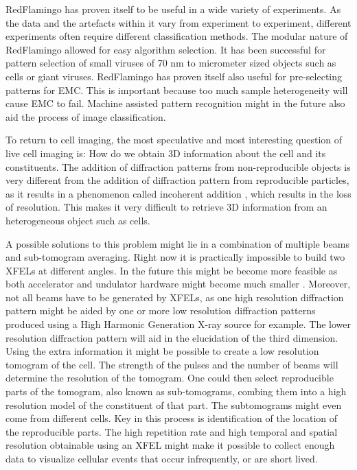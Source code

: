 RedFlamingo has proven itself to be useful in a wide variety of experiments. As the data and the artefacts within it vary from experiment to experiment, different experiments often require different classification methods. The modular nature of RedFlamingo allowed for easy algorithm selection. It has been successful for pattern selection of small viruses of 70 nm to micrometer sized objects such as cells or giant viruses. RedFlamingo has proven itself also useful for pre-selecting patterns for EMC. This is important because too much sample heterogeneity will cause EMC to fail. Machine assisted pattern recognition might in the future also aid the process of image classification. 

To return to cell imaging, the most speculative and most interesting question of live cell imaging is: How do we obtain 3D information about the cell and its constituents. The addition of diffraction patterns from non-reproducible objects is very different from the addition of diffraction pattern from reproducible particles, as it results in a phenomenon called incoherent addition \cite{Maia2009}, which results in the loss of resolution. This makes it very difficult to retrieve 3D information from an heterogeneous object such as cells. 

A possible solutions to this problem might lie in a combination of multiple beams and sub-tomogram averaging. Right now it is practically impossible to build two XFELs at different angles. In the future this might be become more feasible as both accelerator and undulator hardware might become much smaller \cite{Tajima1979}. Moreover, not all beams have to be generated by XFELs, as one high resolution diffraction pattern might be aided by one or more low resolution diffraction patterns produced using a High Harmonic Generation X-ray source for example. The lower resolution diffraction pattern will aid in the elucidation of the third dimension. Using the extra information it might be possible to create a low resolution tomogram of the cell. The strength of the pulses and the number of beams will determine the resolution of the tomogram. One could then select reproducible parts of the tomogram, also known as sub-tomograms, combing them into a high resolution model of the constituent of that part. The subtomograms might even come from different cells. Key in this process is identification of the location of the reproducible parts. The high repetition rate and high temporal and spatial resolution obtainable using an XFEL might make it possible to collect enough data to visualize cellular events that occur infrequently, or are short lived. 